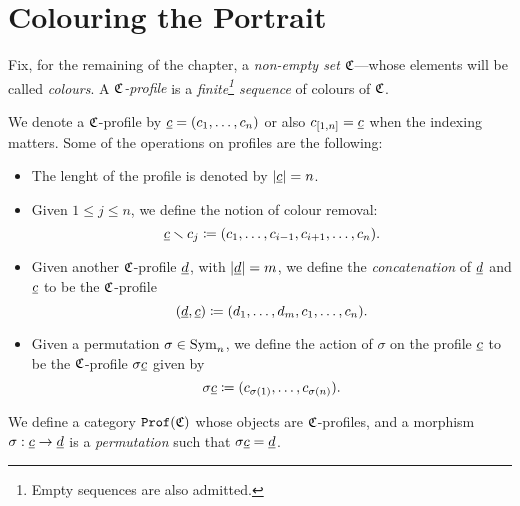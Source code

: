 \section{Colouring the Portrait}

\begin{definition}
\label{def:colors-profiles}
Fix, for the remaining of the chapter, a \emph{non-empty set} \(\mathfrak{C}\)---whose
elements will be called \emph{colours}. A \emph{\(\mathfrak{C}\)-profile} is a
\emph{finite\footnote{Empty sequences are also admitted.} sequence} of colours of
\(\mathfrak{C}\).
\end{definition}

\begin{notation}
\label{not:profiles-and-operations}
We denote a \(\mathfrak{C}\)-profile by \(\underline{c} = (c_1, \dots, c_n)\) or also
\(c_{[1, n]} = \underline{c}\) when the indexing matters. Some of the operations on
profiles are the following:
\begin{itemize}\setlength\itemsep{0em}
\item The lenght of the profile is denoted by \(|\underline{c}| = n\).
\item Given \(1 \leq j \leq n\), we define the notion of colour removal:
  \[
  \underline{c} \smallsetminus c_j \coloneq (c_1, \dots, c_{i-1}, c_{i+1}, \dots, c_n).
  \]
\item Given another \(\mathfrak{C}\)-profile \(\underline{d}\), with \(|\underline{d}| = m\), we
  define the \emph{concatenation} of \(\underline{d}\) and \(\underline{c}\) to be the
  \(\mathfrak{C}\)-profile
  \[
  (\underline{d}, \underline{c}) \coloneq (d_1, \dots, d_m, c_1, \dots, c_n).
  \]
\item Given a permutation \(\sigma \in \operatorname{Sym}_n\), we define the action of
  \(\sigma\) on the profile \(\underline{c}\) to be the \(\mathfrak{C}\)-profile \(\sigma
  \underline{c}\) given by
  \[
  \sigma \underline{c} \coloneq (c_{\sigma(1)}, \dots, c_{\sigma(n)}).
  \]
\end{itemize}
\end{notation}

\begin{definition}
\label{def:profile-category}
We define a category \({\texttt{Prof}(\mathfrak{C})}\) whose objects are \(\mathfrak{C}\)-profiles, and a
morphism \(\sigma: \underline{c} \to \underline{d}\) is a \emph{permutation} such that
\(\sigma \underline{c} = \underline{d}\).
\end{definition}

